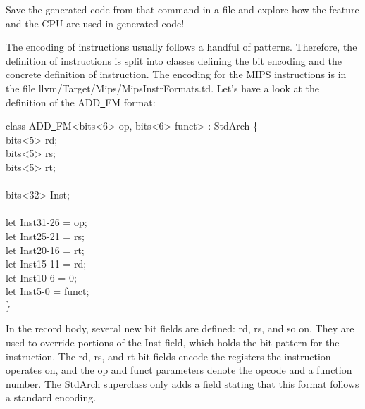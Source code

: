 Save the generated code from that command in a file and explore how the feature and the CPU are used in generated code!\par

The encoding of instructions usually follows a handful of patterns. Therefore, the definition of instructions is split into classes defining the bit encoding and the concrete definition of instruction. The encoding for the MIPS instructions is in the file llvm/Target/Mips/MipsInstrFormats.td. Let's have a look at the definition of the ADD\underline{~}FM format:\par

\begin{tcolorbox}[colback=white,colframe=black]
class ADD\underline{~}FM<bits<6> op, bits<6> funct> : StdArch \{ \\
\hspace*{0.5cm}	bits<5> rd; \\
\hspace*{0.5cm}	bits<5> rs; \\
\hspace*{0.5cm}	bits<5> rt; \\
\\
\hspace*{0.5cm}	bits<32> Inst; \\
\\
\hspace*{0.5cm}	let Inst{31-26} = op; \\
\hspace*{0.5cm}	let Inst{25-21} = rs; \\
\hspace*{0.5cm}	let Inst{20-16} = rt; \\
\hspace*{0.5cm}	let Inst{15-11} = rd; \\
\hspace*{0.5cm}	let Inst{10-6} = 0; \\
\hspace*{0.5cm}	let Inst{5-0} = funct; \\
\}
\end{tcolorbox}

In the record body, several new bit fields are defined: rd, rs, and so on. They are used to override portions of the Inst field, which holds the bit pattern for the instruction. The rd, rs, and rt bit fields encode the registers the instruction operates on, and the op and funct parameters denote the opcode and a function number. The StdArch superclass only adds a field stating that this format follows a standard encoding.\par

